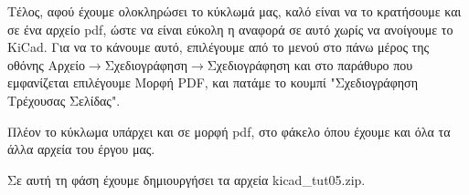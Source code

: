 \documentclass[a4paper]{article}
\begin{document}
Τέλος, αφού έχουμε ολοκληρώσει το κύκλωμά μας, καλό είναι να το κρατήσουμε και σε ένα αρχείο pdf, ώστε να είναι εύκολη η αναφορά σε αυτό χωρίς να ανοίγουμε το KiCad. Για να το κάνουμε αυτό, επιλέγουμε από το μενού στο πάνω μέρος της οθόνης Αρχείο$\rightarrow$Σχεδιογράφηση$\rightarrow$Σχεδιογράφηση και στο παράθυρο που εμφανίζεται επιλέγουμε Μορφή PDF, και πατάμε το κουμπί "Σχεδιογράφηση Τρέχουσας Σελίδας". 

\begin{figure}
  \begin{center}
    \label{fig:kicad-main}
  \end{center}
\end{figure}

Πλέον το κύκλωμα υπάρχει και σε μορφή pdf, στο φάκελο όπου έχουμε και όλα τα άλλα αρχεία του έργου μας.

Σε αυτή τη φάση έχουμε δημιουργήσει τα αρχεία kicad\_tut05.zip.

\end{document}
